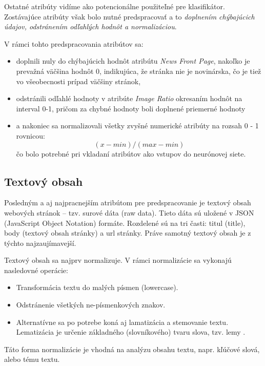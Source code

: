 \documentclass{iitsrc}
\begin{document}
\begin{multicols}{2}
Ostatné atribúty vidíme ako potencionálne použiteľné pre klasifikátor. Zostávajúce atribúty však bolo nutné predspracovať a to \emph{doplnením chýbajúcich údajov, odstránením odľahlých hodnôt a normalizáciou}.

V rámci tohto predspracovania atribútov sa:

\begin{itemize}
	\item doplnili nuly do chýbajúcich hodnôt atribútu \emph{News Front Page}, nakoľko je prevažná väčšina hodnôt 0, indikujúca, že stránka nie je novinárska, čo je tiež vo všeobecnosti prípad väčšiny stránok,
	\item odstránili odľahlé hodnoty v atribúte \emph{Image Ratio} okresaním hodnôt na interval 0-1, pričom za chybné hodnoty boli doplnené priemerné hodnoty
	\item a nakoniec sa normalizovali všetky zvyšné numerické atribúty na rozsah 0 - 1 rovnicou:
	\begin{equation}
	(x - min)/(max - min)
	\end{equation}
	čo bolo potrebné pri vkladaní atribútov ako vstupov do neurónovej siete.
\end{itemize}

\subsection{Textový obsah}
Posledným a aj najpracnejším atribútom pre predspracovanie je textový obsah webových stránok – tzv. surové dáta (raw data). Tieto dáta sú uložené v JSON (JavaScript Object Notation) formáte. Rozdelené sú na tri časti: titul (title), body (textový obsah stránky) a url stránky. Práve samotný textový obsah je z týchto najzaujímavejší.

Textový obsah sa najprv normalizuje. V rámci normalizácie sa vykonajú nasledovné operácie:

\begin{itemize}
	\item Transformácia textu do malých písmen (lowercase).
	\item Odstránenie všetkých ne-písmenkových znakov.
	\item Alternatívne sa po potrebe koná aj lamatizácia a stemovanie textu. Lematizácia je určenie základného (slovníkového) tvaru slova, tzv. lemy \cite{fiittext}.
\end{itemize}
%
Táto forma normalizácie je vhodná na analýzu obsahu textu, napr. kľúčové slová, alebo tému textu.


\end{multicols}
\end{document}
